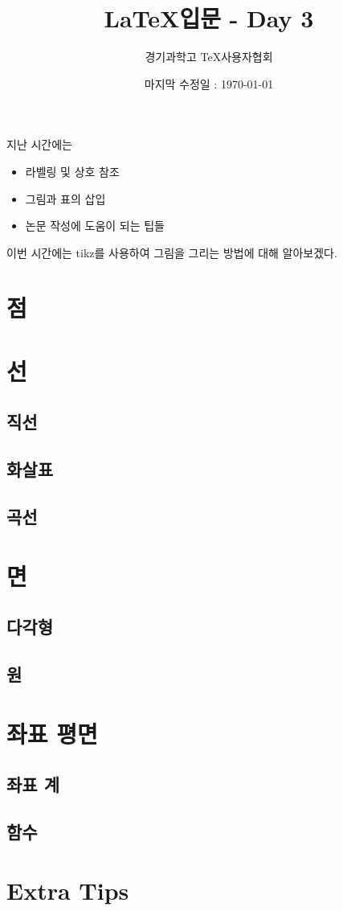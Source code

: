 \documentclass[12pt]{beamer}
\title[\LaTeX - Day 3]{\LaTeX 입문 - Day 3}
\author{경기과학고 \TeX 사용자협회}
\institute[GSHSTeXSociety]{\url{latex.gs.hs.kr}}
\date{마지막 수정일 : \today}
\begin{document}
\begin{frame}
\titlepage %
\end{frame}

\begin{frame}{지난 시간에는}
	\begin{itemize}
		\item 라벨링 및 상호 참조
		\item 그림과 표의 삽입
		\item 논문 작성에 도움이 되는 팁들
	\end{itemize}
	이번 시간에는 tikz를 사용하여 그림을 그리는 방법에 대해 알아보겠다.
\end{frame}

\section{점}
\begin{frame}{\secname}

\end{frame}

\begin{frame}{\secname}

\end{frame}


\section{선}

\subsection{직선}
\subsection{화살표}
\subsection{곡선}

\section{면}
\subsection{다각형}
\subsection{원}

\section{좌표 평면}
\subsection{좌표 계}
\subsection{함수}

\section{Extra Tips}
\end{document}
